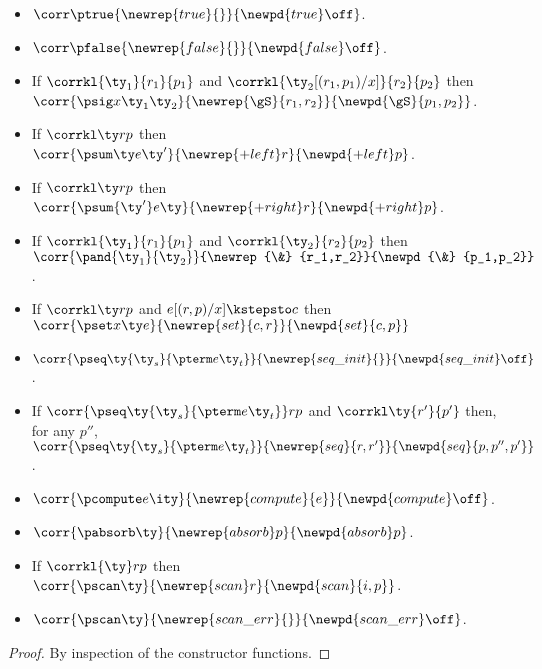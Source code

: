 \begin{lemma}
  \label{lem:cons-props}
  \begin{itemize}
  \item $\corr \ptrue {\newrep {true} {}} {\newpd {true} \off}$.
  \item $\corr \pfalse {\newrep {false} {}} {\newpd {false} \off}$.
  \item If $\corrkl {\ty_1} {r_1} {p_1}$ and $\corrkl {\ty_2[(r_1,p_1)/x]} {r_2} {p_2}$
    then\\ $\corr {\psig x {\ty_1} {\ty_2}}
    {\newrep {\gS} {r_1,r_2}}{\newpd {\gS} {p_1,p_2}}$.
  \item If $\corrkl \ty r p$ then $\corr {\psum \ty e {\ty'}} 
      {\newrep {+left} r} {\newpd {+left} p}$.
  \item If $\corrkl \ty r p$ then $\corr {\psum {\ty'} e \ty} 
      {\newrep {+right} r} {\newpd {+right} p}$.
  \item If $\corrkl {\ty_1} {r_1} {p_1}$ and $\corrkl {\ty_2} {r_2} {p_2}$
    then\\ $\corr {\pand {\ty_1} {\ty_2}}
    {\newrep {\&} {r_1,r_2}}{\newpd {\&} {p_1,p_2}}$.
  \item If $\corrkl \ty r p$ and $e[(r,p)/x] \kstepsto c$ then\\ $\corr {\pset x \ty e} 
    {\newrep {set} {c,r}} {\newpd {set} {c,p}}$
  \item $\corr {\pseq \ty {\ty_s}{\pterm e {\ty_t}}} 
    {\newrep {seq\_init} {}} {\newpd {seq\_init} \off}$.
  \item If $\corr {\pseq \ty {\ty_s} {\pterm e {\ty_t}}} r p$ and
    $\corrkl \ty {r'} {p'}$ then, for any $p''$,\\
    $\corr {\pseq \ty {\ty_s}{\pterm e {\ty_t}}}
    {\newrep {seq} {r,r'}} {\newpd {seq} {p,p'',p'}}$.    
  \item $\corr {\pcompute e \ity} {\newrep {compute} {e}} {\newpd {compute} \off}$.
  \item $\corr {\pabsorb \ty} {\newrep {absorb} p} {\newpd {absorb} p}$.
  \item If $\corrkl {\ty} r p$ then $\corr {\pscan \ty} 
      {\newrep {scan} r} {\newpd {scan} {i,p}}$.
  \item $\corr {\pscan \ty} 
      {\newrep {scan\_err} {}} {\newpd {scan\_err} \off}$.
  \end{itemize}
\end{lemma}

\begin{proof}
  By inspection of the constructor functions. 
\end{proof}

